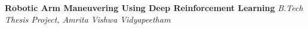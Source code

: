 \documentclass[10pt,a4]{article}
\begin{document}
{\begin{flushleft}

        \item \hspace{1.5mm} \textbf{\large Robotic Arm Maneuvering Using Deep Reinforcement Learning}
        \hfill \textit{B.Tech Thesis Project, Amrita Vishwa Vidyapeetham}


\end{flushleft}}
\end{document}
